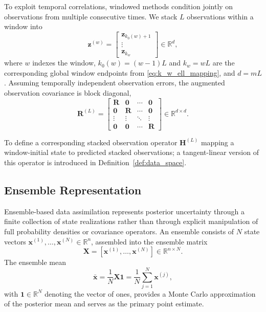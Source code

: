 \documentclass[11pt,a4paper]{article}
\begin{document}
To exploit temporal correlations, windowed methods condition jointly on observations from multiple consecutive times. We stack $L$ observations within a window into
\begin{equation}
\mathbf{z}^{(w)}
=
\begin{bmatrix}
\mathbf{z}_{k_0(w)+1}\\
\vdots\\
\mathbf{z}_{k_w}
\end{bmatrix}
\in\mathbb{R}^{d},
\label{eq:stacked_obs}
\end{equation}
where $w$ indexes the window, $k_0(w)=(w-1)L$ and $k_w=wL$ are the corresponding global window endpoints from \eqref{eq:k_w_ell_mapping}, and $d=mL$. Assuming temporally independent observation errors, the augmented observation covariance is block diagonal,
\begin{equation}
\mathbf{R}^{(L)}
=
\begin{bmatrix}
\mathbf{R} & \mathbf{0} & \cdots & \mathbf{0} \\
\mathbf{0} & \mathbf{R} & \cdots & \mathbf{0} \\
\vdots & \vdots & \ddots & \vdots \\
\mathbf{0} & \mathbf{0} & \cdots & \mathbf{R}
\end{bmatrix}
\in\mathbb{R}^{d\times d}.
\end{equation}

 To define a corresponding stacked observation operator $\mathbf{H}^{(L)}$ mapping a window-initial state to predicted stacked observations; a tangent-linear version of this operator is introduced in Definition~\ref{def:data_space}.












\subsection{Ensemble Representation}
\label{subsec:ensemble_uq}

Ensemble-based data assimilation represents posterior uncertainty through a finite collection of state realizations rather than through explicit manipulation of full probability densities or covariance operators. An ensemble consists of $N$ state vectors $\mathbf{x}^{(1)},\ldots,\mathbf{x}^{(N)}\in\mathbb{R}^n$, assembled into the ensemble matrix
\begin{equation}
\mathbf{X} = [\mathbf{x}^{(1)},\ldots,\mathbf{x}^{(N)}]\in\mathbb{R}^{n\times N}.
\end{equation}
The ensemble mean
\begin{equation}
\bar{\mathbf{x}}
=
\frac{1}{N}\mathbf{X}\mathbf{1}
=
\frac{1}{N}\sum_{j=1}^N \mathbf{x}^{(j)},
\label{eq:ensemble_mean}
\end{equation}
with $\mathbf{1}\in\mathbb{R}^N$ denoting the vector of ones, provides a Monte Carlo approximation of the posterior mean and serves as the primary point estimate.
\end{document}

